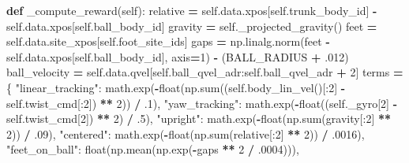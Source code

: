 \documentclass[
  american,
  11pt,
  letterpaper,
]{article}
\newenvironment{Shaded}{\begin{snugshade}}{\end{snugshade}}
\newcommand{\BuiltInTok}[1]{#1}
\newcommand{\DecValTok}[1]{\textcolor[rgb]{0.00,0.00,0.81}{#1}}
\newcommand{\FloatTok}[1]{\textcolor[rgb]{0.00,0.00,0.81}{#1}}
\newcommand{\KeywordTok}[1]{\textcolor[rgb]{0.13,0.29,0.53}{\textbf{#1}}}
\newcommand{\NormalTok}[1]{#1}
\newcommand{\OperatorTok}[1]{\textcolor[rgb]{0.81,0.36,0.00}{\textbf{#1}}}
\newcommand{\StringTok}[1]{\textcolor[rgb]{0.31,0.60,0.02}{#1}}
\newcommand{\VariableTok}[1]{\textcolor[rgb]{0.00,0.00,0.00}{#1}}
\renewenvironment{Shaded}{\par\smallskip}{\par\smallskip}
\begin{document}
\begin{Shaded}
\begin{Highlighting}[]
    \KeywordTok{def}\NormalTok{ \_compute\_reward(}\VariableTok{self}\NormalTok{):}
\NormalTok{        relative }\OperatorTok{=} \VariableTok{self}\NormalTok{.data.xpos[}\VariableTok{self}\NormalTok{.trunk\_body\_id] }\OperatorTok{{-}} \VariableTok{self}\NormalTok{.data.xpos[}\VariableTok{self}\NormalTok{.ball\_body\_id]}
\NormalTok{        gravity }\OperatorTok{=} \VariableTok{self}\NormalTok{.\_projected\_gravity()}
\NormalTok{        feet }\OperatorTok{=} \VariableTok{self}\NormalTok{.data.site\_xpos[}\VariableTok{self}\NormalTok{.foot\_site\_ids]}
\NormalTok{        gaps }\OperatorTok{=}\NormalTok{ np.linalg.norm(feet }\OperatorTok{{-}} \VariableTok{self}\NormalTok{.data.xpos[}\VariableTok{self}\NormalTok{.ball\_body\_id], axis}\OperatorTok{=}\DecValTok{1}\NormalTok{) }\OperatorTok{{-}}\NormalTok{ (BALL\_RADIUS }\OperatorTok{+} \FloatTok{.012}\NormalTok{)}
\NormalTok{        ball\_velocity }\OperatorTok{=} \VariableTok{self}\NormalTok{.data.qvel[}\VariableTok{self}\NormalTok{.ball\_qvel\_adr:}\VariableTok{self}\NormalTok{.ball\_qvel\_adr }\OperatorTok{+} \DecValTok{2}\NormalTok{]}
\NormalTok{        terms }\OperatorTok{=}\NormalTok{ \{}
            \StringTok{"linear\_tracking"}\NormalTok{: math.exp(}\OperatorTok{{-}}\BuiltInTok{float}\NormalTok{(np.}\BuiltInTok{sum}\NormalTok{((}\VariableTok{self}\NormalTok{.body\_lin\_vel()[:}\DecValTok{2}\NormalTok{] }\OperatorTok{{-}} \VariableTok{self}\NormalTok{.twist\_cmd[:}\DecValTok{2}\NormalTok{]) }\OperatorTok{**} \DecValTok{2}\NormalTok{)) }\OperatorTok{/} \FloatTok{.1}\NormalTok{),}
            \StringTok{"yaw\_tracking"}\NormalTok{: math.exp(}\OperatorTok{{-}}\BuiltInTok{float}\NormalTok{((}\VariableTok{self}\NormalTok{.\_gyro[}\DecValTok{2}\NormalTok{] }\OperatorTok{{-}} \VariableTok{self}\NormalTok{.twist\_cmd[}\DecValTok{2}\NormalTok{]) }\OperatorTok{**} \DecValTok{2}\NormalTok{) }\OperatorTok{/} \FloatTok{.5}\NormalTok{),}
            \StringTok{"upright"}\NormalTok{: math.exp(}\OperatorTok{{-}}\BuiltInTok{float}\NormalTok{(np.}\BuiltInTok{sum}\NormalTok{(gravity[:}\DecValTok{2}\NormalTok{] }\OperatorTok{**} \DecValTok{2}\NormalTok{)) }\OperatorTok{/} \FloatTok{.09}\NormalTok{),}
            \StringTok{"centered"}\NormalTok{: math.exp(}\OperatorTok{{-}}\BuiltInTok{float}\NormalTok{(np.}\BuiltInTok{sum}\NormalTok{(relative[:}\DecValTok{2}\NormalTok{] }\OperatorTok{**} \DecValTok{2}\NormalTok{)) }\OperatorTok{/} \FloatTok{.0016}\NormalTok{),}
            \StringTok{"feet\_on\_ball"}\NormalTok{: }\BuiltInTok{float}\NormalTok{(np.mean(np.exp(}\OperatorTok{{-}}\NormalTok{gaps }\OperatorTok{**} \DecValTok{2} \OperatorTok{/} \FloatTok{.0004}\NormalTok{))),}

\end{Highlighting}
\end{Shaded}
\end{document}

